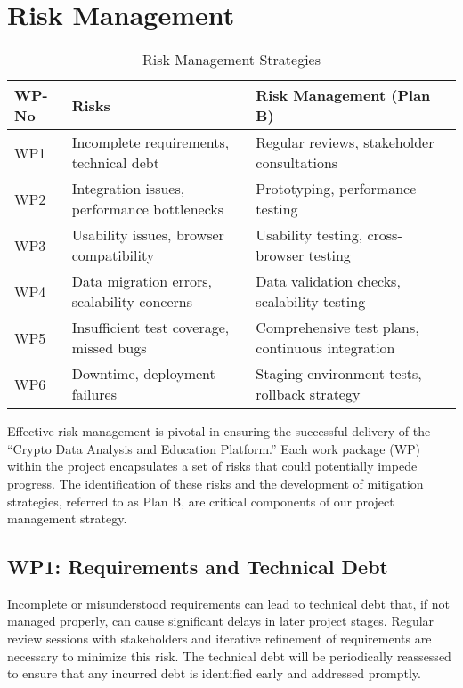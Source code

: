 \documentclass[12pt]{report}
\begin{document}
\section{Risk Management}
\begin{table}[h]
\centering
\begin{tabular}{|l|p{6cm}|p{5cm}|}
\hline
\textbf{WP-No} & \textbf{Risks}                                 & \textbf{Risk Management (Plan B)}          \\ \hline
WP1            & Incomplete requirements, technical debt         & Regular reviews, stakeholder consultations \\ \hline
WP2            & Integration issues, performance bottlenecks     & Prototyping, performance testing           \\ \hline
WP3            & Usability issues, browser compatibility         & Usability testing, cross-browser testing   \\ \hline
WP4            & Data migration errors, scalability concerns     & Data validation checks, scalability testing\\ \hline
WP5            & Insufficient test coverage, missed bugs         & Comprehensive test plans, continuous integration \\ \hline
WP6            & Downtime, deployment failures                  & Staging environment tests, rollback strategy \\ \hline
\end{tabular}
\caption{Risk Management Strategies}
\label{table:risk_management}
\end{table}

Effective risk management is pivotal in ensuring the successful delivery of the ``Crypto Data Analysis and Education Platform.'' Each work package (WP) within the project encapsulates a set of risks that could potentially impede progress. The identification of these risks and the development of mitigation strategies, referred to as Plan B, are critical components of our project management strategy.

\subsection{WP1: Requirements and Technical Debt}
Incomplete or misunderstood requirements can lead to technical debt that, if not managed properly, can cause significant delays in later project stages. Regular review sessions with stakeholders and iterative refinement of requirements are necessary to minimize this risk. The technical debt will be periodically reassessed to ensure that any incurred debt is identified early and addressed promptly.
\end{document}
